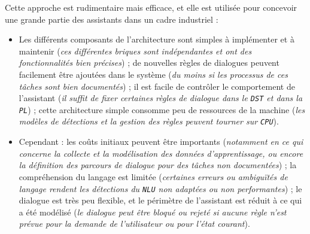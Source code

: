 		
		Cette approche est rudimentaire mais efficace, et elle est utilisée pour concevoir une grande partie des assistants dans un cadre industriel :
		\begin{itemize}
			\item[\faThumbsUp] 
				Les différents composants de l'architecture sont simples à implémenter et à maintenir
				(\textit{ces différentes briques sont indépendantes et ont des fonctionnalités bien précises}) ;
				de nouvelles règles de dialogues peuvent facilement être ajoutées dans le système
				(\textit{du moins si les processus de ces tâches sont bien documentés}) ;
				il est facile de contrôler le comportement de l'assistant
				(\textit{il suffit de fixer certaines règles de dialogue dans le \texttt{DST} et dans la \texttt{PL}}) ;
				cette architecture simple consomme peu de ressources de la machine (\textit{les modèles de détections et la gestion des règles peuvent tourner sur \texttt{CPU}}).
			\item[\faThumbsDown] Cependant :
				les coûts initiaux peuvent être importants (\textit{notamment en ce qui concerne la collecte et la modélisation des données d'apprentissage, ou encore la définition des parcours de dialogue pour des tâches non documentées}) ;
				la compréhension du langage est limitée (\textit{certaines erreurs ou ambiguïtés de langage rendent les détections du \texttt{NLU} non adaptées ou non performantes}) ;
				le dialogue est très peu flexible, et le périmètre de l'assistant est réduit à ce qui a été modélisé (\textit{le dialogue peut être bloqué ou rejeté si aucune règle n'est prévue pour la demande de l'utilisateur ou pour l'état courant}).
		\end{itemize}
		
		\newpage
		
